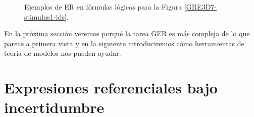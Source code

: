 \begin{figure}[H]
\begin{subfigure}{.6\textwidth}
\vspace*{0.5cm}
%
%
%
%
%
%
%
%



\vspace*{1cm}

\end{subfigure}%
\caption{Ejemplos de ER en f\'ormulas l\'ogicas para la Figura \ref{GRE3D7-stimulus1-ids}.}
\label{formulas-stimulus1}
\end{figure}






 En la pr\'oxima secci\'on veremos porqu\'e la tarea GER es m\'as compleja de lo que parece a primera vista y en la siguiente introduciremos c\'omo herramientas de teor\'ia de modelos nos pueden ayudar.

\section{Expresiones referenciales bajo incertidumbre}
\label{sec:gre-incertidumbre}


